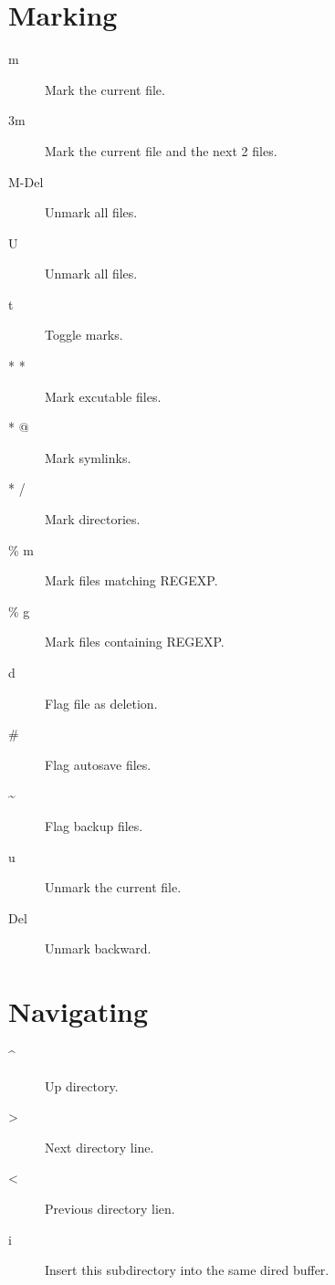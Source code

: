 \section{Marking}

\begin{description}
\item[m] Mark the current file.
\item[3m] Mark the current file and the next 2 files.
\item[M-Del] Unmark all files.
\item[U] Unmark all files.
\item[t] Toggle marks.
\item[* *] Mark excutable files.
\item[* @] Mark symlinks.
\item[* /] Mark directories.
\item[\% m] Mark files matching REGEXP.
\item[\% g] Mark files containing REGEXP.
\item[d] Flag file as deletion.
\item[\#] Flag autosave files.
\item[\~{}] Flag backup files.
\item[u] Unmark the current file.
\item[Del] Unmark backward.
\end{description}


\section{Navigating}

\begin{description}
\item[\^{}] Up directory.
\item[>] Next directory line.
\item[<] Previous directory lien.
\item[i] Insert this subdirectory into the same dired buffer.
\end{description}

